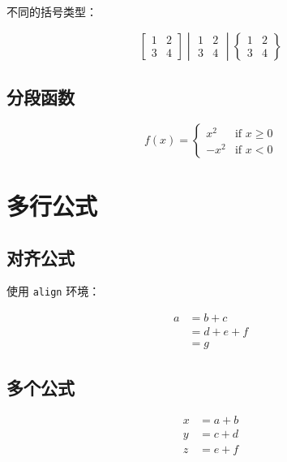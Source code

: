 不同的括号类型：

\begin{equation}
  \begin{bmatrix} 1 & 2 \\ 3 & 4 \end{bmatrix}
  \begin{vmatrix} 1 & 2 \\ 3 & 4 \end{vmatrix}
  \begin{Bmatrix} 1 & 2 \\ 3 & 4 \end{Bmatrix}
\end{equation}

\subsection{分段函数}

\begin{equation}
  f(x) = \begin{cases}
    x^2 & \text{if } x \geq 0 \\
    -x^2 & \text{if } x < 0
  \end{cases}
\end{equation}

\section{多行公式}

\subsection{对齐公式}

使用 \texttt{align} 环境：

\begin{align}
  a &= b + c \\
  &= d + e + f \\
  &= g
\end{align}

\subsection{多个公式}

\begin{align}
  x &= a + b \label{eq:x} \\
  y &= c + d \label{eq:y} \\
  z &= e + f \label{eq:z}
\end{align}

